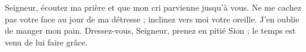 Seigneur, écoutez ma prière et que mon cri parvienne jusqu’à vous.
\versseparator
Ne me cachez pas votre face au jour de ma détresse ; inclinez vers moi votre oreille.
\versseparator
J’en oublie de manger mon pain.
\versseparator
Dressez-vous, Seigneur, prenez en pitié Sion ; le temps est venu de lui faire grâce.
